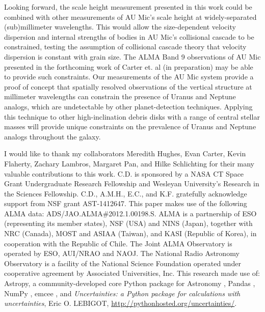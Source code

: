 \documentclass[12pt,oneside]{book}
\begin{document}
Looking forward, the scale height measurement presented in this work could be combined with other measurements of AU Mic's scale height at widely-separated (sub)millimeter wavelengths.
This would allow the size-dependent velocity dispersion and internal strengths of bodies in AU Mic's collisional cascade to be constrained, testing the assumption of collisional cascade theory that velocity dispersion is constant with grain size.
The ALMA Band 9 observations of AU Mic presented in the forthcoming work of Carter et. al (in preparation) may be able to provide such constraints.
Our measurements of the AU Mic system provide a proof of concept that spatially resolved observations of the vertical structure at millimeter wavelengths can constrain the presence of Uranus and Neptune analogs, which are undetectable by other planet-detection techniques.  
Applying this technique to other high-inclination debris disks with a range of central stellar masses will provide unique constraints on the prevalence of Uranus and Neptune analogs throughout the galaxy.

\medskip
\bigskip\bigskip
\bigskip
I would like to thank my collaborators Meredith Hughes, Evan Carter, Kevin Flaherty, Zachary Lambros, Margaret Pan, and Hilke Schlichting for their many valuable contributions to this work.
C.D. is sponsored by a NASA CT Space Grant Undergraduate Research Fellowship and Wesleyan University's Research in the Sciences Fellowship.  
C.D., A.M.H., E.C., and K.F. gratefully acknowledge support from NSF grant AST-1412647.  
This paper makes use of the following ALMA data:  ADS/JAO.ALMA\#2012.1.00198.S.  
ALMA is a partnership of ESO (representing its member states), NSF (USA) and NINS (Japan), together with NRC (Canada), MOST and ASIAA (Taiwan), and KASI (Republic of Korea), in cooperation with the Republic of Chile.  
The Joint ALMA Observatory is operated by ESO, AUI/NRAO and NAOJ.  
The National Radio Astronomy Observatory is a facility of the National Science Foundation operated under cooperative agreement by Associated Universities, Inc.
This research made use of: Astropy, a community-developed core Python package for Astronomy \citep{astropy}, Pandas \citep{mckinney}, NumPy \citep{van2011numpy}, emcee \citep{foreman-mackey13}, and \textit{Uncertainties: a Python package for calculations with uncertainties}, Eric O. LEBIGOT, \url{http://pythonhosted.org/uncertainties/}.


\backmatter
{}
\pagestyle{plain}


\nocite{laplace}
\end{document}
